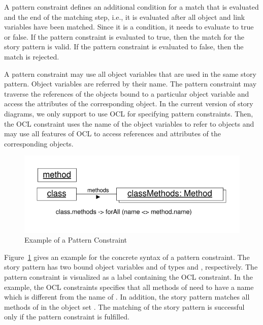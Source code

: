 A pattern constraint defines an additional condition for a match that is evaluated and the end of the matching step, i.e., it is evaluated after all object and link variables have been matched. Since it is a condition, it needs to evaluate to true or false. If the pattern constraint is evaluated to true, then the match for the story pattern is valid. If the pattern constraint is evaluated to false, then the match is rejected.

A pattern constraint may use all object variables that are used in the same story pattern. Object variables are referred by their name. The pattern constraint may traverse the references of the objects bound to a particular object variable and access the attributes of the corresponding object. In the current version of story diagrams, we only support to use OCL for specifying pattern constraints. Then, the OCL constraint uses the name of the object variables to refer to objects and may use all features of OCL to access references and attributes of the corresponding objects.

\begin{figure}[htbp]
\center
\includegraphics[width=0.6\columnwidth]{figures/PatternConstraint}
\caption{Example of a Pattern Constraint}
\label{fig:patternConstraint}
\end{figure}

Figure~\ref{fig:patternConstraint} gives an example for the concrete syntax of a pattern constraint. The story pattern has two bound object variables  and  of types  and , respectively. The pattern constraint is visualized as a label containing the OCL constraint. In the example, the OCL constraints specifies that all methods of  need to have a name which is different from the name of . In addition, the story pattern matches all methods of  in the object set . The matching of the story pattern is successful only if the pattern constraint is fulfilled.



